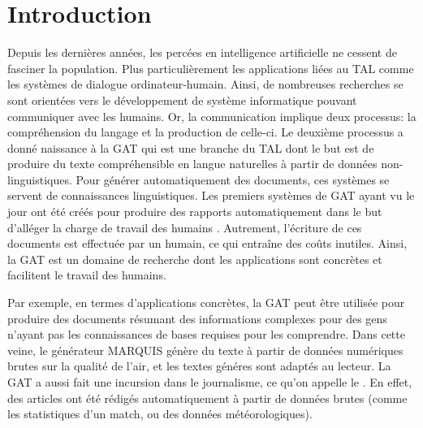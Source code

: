 
\chapter*{Introduction}


Depuis les dernières années, les percées en intelligence artificielle ne cessent de fasciner la population. Plus particulièrement les applications liées au \acf{TAL} comme les systèmes de dialogue ordinateur-humain. Ainsi, de nombreuses recherches se sont orientées vers le développement de système informatique pouvant communiquer avec les humains. Or, la communication implique deux processus: la compréhension du langage et la production de celle-ci. Le deuxième processus a donné naissance à la \acf{GAT} qui est une branche du \ac{TAL} dont le but est de produire du texte compréhensible en langue naturelles à partir de données non-linguistiques. Pour générer automatiquement des documents, ces systèmes se servent de connaissances linguistiques. Les premiers systèmes de \ac{GAT} ayant vu le jour ont été créés pour produire des rapports automatiquement dans le but d'alléger la charge de travail des humains \citep{ReiterBuildingNaturalLanguage2000}. Autrement, l'écriture de ces documents est effectuée par un humain, ce qui entraîne des coûts inutiles. Ainsi, la \ac{GAT} est un domaine de recherche dont les applications sont concrètes et facilitent le travail des humains.

Par exemple, en termes d'applications concrètes, la \ac{GAT} peut être utilisée pour produire des documents résumant des informations complexes pour des gens n'ayant pas les connaissances de bases requises pour les comprendre. Dans cette veine, le générateur MARQUIS \citep{WannerMARQUISGENERATIONUSERTAILORED2010} génère du texte à partir de données numériques brutes sur la qualité de l'air, et les textes généres sont adaptés au lecteur. La \ac{GAT} a aussi fait une incursion dans le journalisme, ce qu'on appelle le  \citep{W17-3513}. En effet, des articles ont été rédigés automatiquement à partir de données brutes (comme les statistiques d'un match, ou des données météorologiques).

